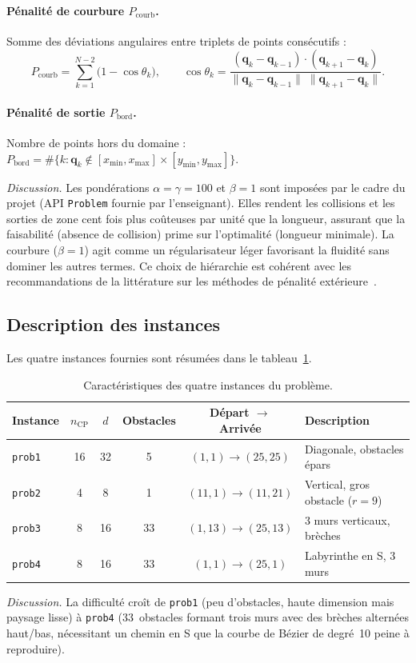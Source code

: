 \paragraph{Pénalité de courbure $P_{\text{courb}}$.}
Somme des déviations angulaires entre triplets de points consécutifs :
\[
  P_{\text{courb}} = \sum_{k=1}^{N-2} \bigl(1 - \cos\theta_k\bigr),
  \qquad
  \cos\theta_k = \frac{(\mathbf{q}_k - \mathbf{q}_{k-1}) \cdot
                        (\mathbf{q}_{k+1} - \mathbf{q}_k)}
                       {\|\mathbf{q}_k - \mathbf{q}_{k-1}\|\;
                        \|\mathbf{q}_{k+1} - \mathbf{q}_k\|}.
\]

\paragraph{Pénalité de sortie $P_{\text{bord}}$.}
Nombre de points hors du domaine :
$P_{\text{bord}} = \#\{k : \mathbf{q}_k \notin
[x_{\min}, x_{\max}] \times [y_{\min}, y_{\max}]\}$.

\emph{Discussion.}  Les pondérations $\alpha = \gamma = 100$ et $\beta = 1$
sont imposées par le cadre du projet (API \texttt{Problem} fournie par
l'enseignant).  Elles rendent les collisions et les sorties de zone cent fois
plus coûteuses par unité que la longueur, assurant que la faisabilité
(absence de collision) prime sur l'optimalité (longueur minimale).  La courbure
($\beta = 1$) agit comme un régularisateur léger favorisant la fluidité sans
dominer les autres termes.  Ce choix de hiérarchie est cohérent avec les
recommandations de la littérature sur les méthodes de pénalité
extérieure~\cite{coello2002}.

\subsection{Description des instances}
\label{sec:instances}

Les quatre instances fournies sont résumées dans le tableau~\ref{tab:instances}.

\begin{table}[H]
\centering
\caption{Caractéristiques des quatre instances du problème.}
\label{tab:instances}
\begin{tabular}{@{}lccccl@{}}
\toprule
Instance & $n_{\text{CP}}$ & $d$ & Obstacles & Départ $\to$ Arrivée & Description \\
\midrule
\texttt{prob1} & 16 & 32 & 5  & $(1,1) \to (25,25)$  & Diagonale, obstacles épars \\
\texttt{prob2} & 4  & 8  & 1  & $(11,1) \to (11,21)$  & Vertical, gros obstacle ($r=9$) \\
\texttt{prob3} & 8  & 16 & 33 & $(1,13) \to (25,13)$ & 3 murs verticaux, brèches \\
\texttt{prob4} & 8  & 16 & 33 & $(1,1) \to (25,1)$   & Labyrinthe en S, 3 murs \\
\bottomrule
\end{tabular}
\end{table}

\emph{Discussion.}  La difficulté croît de \texttt{prob1} (peu d'obstacles,
haute dimension mais paysage lisse) à \texttt{prob4} (33~obstacles formant
trois murs avec des brèches alternées haut/bas, nécessitant un chemin en S
que la courbe de Bézier de degré~10 peine à reproduire).
